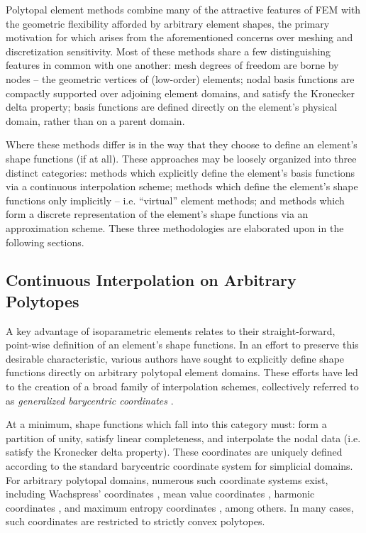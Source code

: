 	Polytopal element methods combine many of the attractive features of FEM with the geometric flexibility afforded by arbitrary element shapes, the primary motivation for which arises from the aforementioned concerns over meshing and discretization sensitivity. Most of these methods share a few distinguishing features in common with one another: mesh degrees of freedom are borne by nodes -- the geometric vertices of (low-order) elements; nodal basis functions are compactly supported over adjoining element domains, and satisfy the Kronecker delta property; basis functions are defined directly on the element's physical domain, rather than on a parent domain.
	
	
	Where these methods differ is in the way that they choose to define an element's shape functions (if at all). These approaches may be loosely organized into three distinct categories: methods which explicitly define the element's basis functions via a continuous interpolation scheme; methods which define the element's shape functions only implicitly -- i.e. ``virtual'' element methods; and methods which form a discrete representation of the element's shape functions via an approximation scheme. These three methodologies are elaborated upon in the following sections.

	\subsection*{Continuous Interpolation on Arbitrary Polytopes}
		A key advantage of isoparametric elements relates to their straight-forward, point-wise definition of an element's shape functions. In an effort to preserve this desirable characteristic, various authors have sought to explicitly define shape functions directly on arbitrary polytopal element domains. These efforts have led to the creation of a broad family of interpolation schemes, collectively referred to as \textit{generalized barycentric coordinates} \cite{Sukumar:17}.
		
		At a minimum, shape functions which fall into this category must: form a partition of unity, satisfy linear completeness, and interpolate the nodal data (i.e. satisfy the Kronecker delta property). These coordinates are uniquely defined according to the standard barycentric coordinate system for simplicial domains. For arbitrary polytopal domains, numerous such coordinate systems exist, including Wachspress' coordinates \cite{Wachspress:75}, mean value coordinates \cite{Floater:03}, harmonic coordinates \cite{Joshi:07}, and maximum entropy coordinates \cite{Sukumar:04}, among others. In many cases, such coordinates are restricted to strictly convex polytopes.
			
